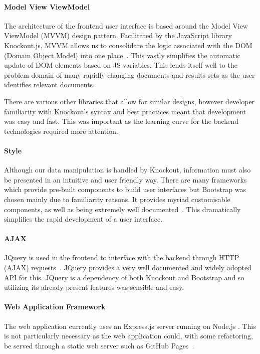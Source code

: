 \documentclass{l4proj}
\begin{document}
\paragraph{Model View ViewModel}
The architecture of the frontend user interface is based around the Model View ViewModel (MVVM) design pattern. Facilitated by the JavaScript library Knockout.js, MVVM allows us to consolidate the logic associated with the DOM (Domain Object Model) into one place~\cite{knockout}.
This vastly simplifies the automatic update of DOM elements based on JS variables.
This lends itself well to the problem domain of many rapidly changing documents and results sets as the user identifies relevant documents.

There are various other libraries that allow for similar designs, however developer familiarity with Knockout's syntax and best practices meant that development was easy and fast.
This was important as the learning curve for the backend technologies required more attention.

\paragraph{Style}
Although our data manipulation is handled by Knockout, information must also be presented in an intuitive and user friendly way. There are many frameworks which provide pre-built components to build user interfaces but Bootstrap was chosen mainly due to familiarity reasons. It provides myriad customisable components, as well as being extremely well documented~\cite{bootstrap}. This dramatically simplifies the rapid development of a user interface.

\paragraph{AJAX}
JQuery is used in the frontend to interface with the backend through HTTP (AJAX) requests~\cite{jquery}. JQuery provides a very well documented and widely adopted API for this. JQuery is a dependency of both Knockout and Bootstrap and so utilizing its already present features was sensible and easy.

\paragraph{Web Application Framework}
The web application currently uses an Express.js server running on Node.js \cite{express,node}. This is not particularly necessary as the web application could, with some refactoring, be served through a static web server such as GitHub Pages~\cite{githubpages}.
\end{document}
